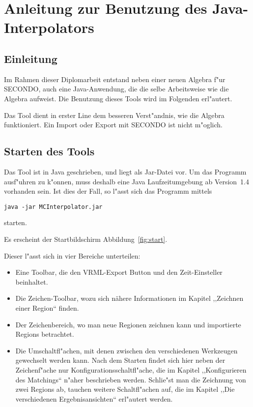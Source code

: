 
\chapter{Anleitung zur Benutzung des Java-Interpolators}\label{Handbuch}
\minitoc
\newpage
\section{Einleitung}
Im Rahmen dieser Diplomarbeit entstand neben einer neuen Algebra f"ur SECONDO, auch eine Java-Anwendung, die die selbe Arbeitsweise wie die Algebra aufweist. Die Benutzung dieses Tools wird im Folgenden erl"autert.

Das Tool dient in erster Line dem besseren Verst"andnis, wie die Algebra funktioniert. Ein Import oder Export mit SECONDO ist nicht m"oglich.

\section{Starten des Tools}
Das Tool ist in Java geschrieben, und liegt als Jar-Datei vor. Um das Programm ausf"uhren zu k"onnen, muss deshalb eine Java Laufzeitumgebung ab Version~1.4 vorhanden sein. Ist dies der Fall, so l"asst sich das Programm mittels \begin{verbatim}
java -jar MCInterpolator.jar
\end{verbatim}  starten.

Es erscheint der Startbildschirm Abbildung~\vref{fig:start}.

Dieser l"asst sich in vier Bereiche unterteilen:
\begin{itemize}
\item Eine Toolbar, die den VRML-Export Button und den Zeit-Einsteller beinhaltet. 
\item Die Zeichen-Toolbar, wozu sich nähere Informationen im Kapitel ,,Zeichnen einer Region`` finden.
\item Der Zeichenbereich, wo man neue Regionen zeichnen kann und importierte Regions betrachtet.
\item Die Umschaltfl"achen,  mit denen zwischen den verschiedenen Werkzeugen gewechselt werden kann. Nach dem Starten findet sich hier neben der Zeichenf"ache nur Konfigurationsschaltfl"ache, die im Kapitel ,,Konfigurieren des Matchings`` n"aher beschrieben werden. Schlie"st man die Zeichnung von zwei Regions ab, tauchen weitere Schaltfl"achen auf, die im Kapitel ,,Die verschiedenen Ergebnisansichten`` erl"autert werden.
\end{itemize} 

